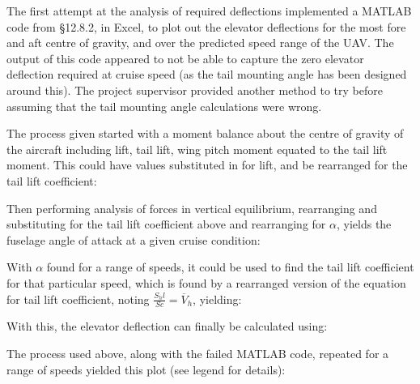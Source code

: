 \documentclass[../../main.tex]{subfiles}
\begin{document}
The first attempt at the analysis of required deflections implemented a MATLAB code from \cite{sadraey-13} \S 12.8.2, in Excel, to plot out the elevator deflections for the most fore and aft centre of gravity, and over the predicted speed range of the UAV.
The output of this code appeared to not be able to capture the zero elevator deflection required at cruise speed (as the tail mounting angle has been designed around this).
The project supervisor provided another method to try before assuming that the tail mounting angle calculations were wrong.  

The process given started with a moment balance about the centre of gravity of the aircraft including lift, tail lift, wing pitch moment equated to the tail lift moment.
This could have values substituted in for lift, and be rearranged for the tail lift coefficient: 


Then performing analysis of forces in vertical equilibrium, rearranging and substituting for the tail lift coefficient above and rearranging for $\alpha$, yields the fuselage angle of attack at a given cruise condition: 


With $\alpha$ found for a range of speeds, it could be used to find the tail lift coefficient for that particular speed, which is found by a rearranged version of the equation for tail lift coefficient, noting $\frac{S_h l}{Sc} = \overline{V}_h$, yielding: 


With this, the elevator deflection can finally be calculated using:


The process used above, along with the failed MATLAB code, repeated for a range of speeds yielded this plot (see legend for details):

\end{document}
